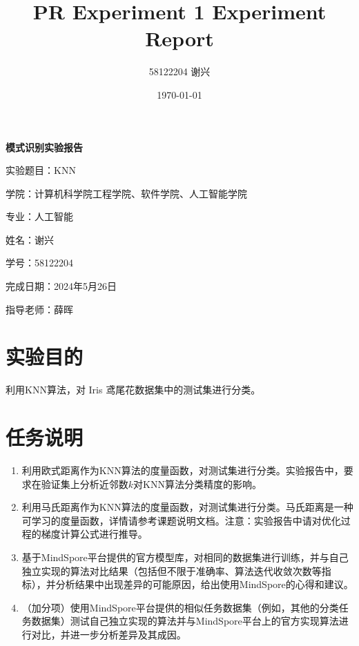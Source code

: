 \documentclass[12pt]{article}
\title{\textbf{PR Experiment 1 Experiment Report}}
\author{58122204 谢兴}
\date{\today}
\begin{document}
\begin{titlepage}

  \centering
  \vspace*{40pt}
  \Huge\textbf{模式识别实验报告}

  \vspace{60pt}
  \Large
  实验题目：KNN

  \vspace{25pt}
  学院：计算机科学院工程学院、软件学院、人工智能学院

  \vspace{25pt}
  专业：人工智能

  \vspace{25pt}
  姓名：谢兴

  \vspace{25pt}
  学号：58122204

  \vspace{25pt}
  完成日期：2024年5月26日

  \vspace{25pt}
  指导老师：薛晖
\end{titlepage}

\newpage
\tableofcontents

\section*{实验目的}
利用KNN算法，对 Iris 鸢尾花数据集中的测试集进行分类。

\section{任务说明}
\begin{enumerate}
  \item 利用欧式距离作为KNN算法的度量函数，对测试集进行分类。实验报告中，要求在验证集上分析近邻数$k$对KNN算法分类精度的影响。
  \item 利用马氏距离作为KNN算法的度量函数，对测试集进行分类。马氏距离是一种可学习的度量函数，详情请参考课题说明文档。注意：实验报告中请对优化过程的梯度计算公式进行推导。
  \item 基于MindSpore平台提供的官方模型库，对相同的数据集进行训练，并与自己独立实现的算法对比结果（包括但不限于准确率、算法迭代收敛次数等指标），并分析结果中出现差异的可能原因，给出使用MindSpore的心得和建议。
  \item （加分项）使用MindSpore平台提供的相似任务数据集（例如，其他的分类任务数据集）测试自己独立实现的算法并与MindSpore平台上的官方实现算法进行对比，并进一步分析差异及其成因。
\end{enumerate}
\end{document}
